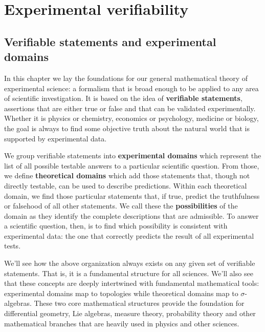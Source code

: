 \documentclass[11pt,letterpaper,fleqn]{memoir} %
\begin{document}
\cleardoublepage %

\tableofcontents* %

\cleardoublepage %


\mainmatter

\part{Experimental verifiability}

\chapter{Verifiable statements and experimental domains}

In this chapter we lay the foundations for our general mathematical theory of experimental science: a formalism that is broad enough to be applied to any area of scientific investigation. It is based on the idea of \textbf{verifiable statements}, assertions that are either true or false and that can be validated experimentally. Whether it is physics or chemistry, economics or psychology, medicine or biology, the goal is always to find some objective truth about the natural world that is supported by experimental data.

We group verifiable statements into \textbf{experimental domains} which represent the list of all possible testable answers to a particular scientific question. From those, we define \textbf{theoretical domains} which add those statements that, though not directly testable, can be used to describe predictions. Within each theoretical domain, we find those particular statements that, if true, predict the truthfulness or falsehood of all other statements. We call these the \textbf{possibilities} of the domain as they identify the complete descriptions that are admissible. To answer a scientific question, then, is to find which possibility is consistent with experimental data: the one that correctly predicts the result of all experimental tests.

We'll see how the above organization always exists on any given set of verifiable statements. That is, it is a fundamental structure for all sciences. We'll also see that these concepts are deeply intertwined with fundamental mathematical tools: experimental domains map to topologies while theoretical domains map to $\sigma$-algebras. These two core mathematical structures provide the foundation for differential geometry, Lie algebras, measure theory, probability theory and other mathematical branches that are heavily used in physics and other sciences.
\end{document}
